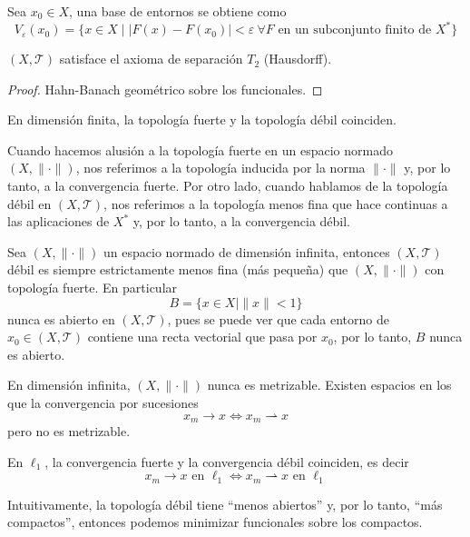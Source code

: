 \begin{observacion}
    Sea $x_0 \in X$, una base de entornos se obtiene como
    \[ V_\varepsilon(x_0) = \{ x \in X \mid |F(x) - F(x_0)| < \varepsilon \ \forall F \text{ en un subconjunto finito de } X^* \} \]
\end{observacion}


\begin{prop}
    $(X, \mathcal{T})$ satisface el axioma de separación $T_2$ (Hausdorff).
\begin{proof}
    Hahn-Banach geométrico sobre los funcionales.
\end{proof}
\end{prop}

\begin{observacion}
    En dimensión finita, la topología fuerte y la topología débil coinciden.
\end{observacion}


\begin{observacion}
    Cuando hacemos alusión a la topología fuerte en un espacio normado $(X,\|\cdot\|)$, nos referimos a la topología inducida por la norma $\|\cdot\|$ y, por lo tanto, a la convergencia fuerte. Por otro lado, cuando hablamos de la topología débil en $(X, \mathcal{T})$, nos referimos a la topología menos fina que hace continuas a las aplicaciones de $X^*$ y, por lo tanto, a la convergencia débil.
\end{observacion}

\begin{observacion}
    Sea $(X, \|\cdot\|)$ un espacio normado de dimensión infinita, entonces $(X, \mathcal{T})$ débil es siempre estrictamente menos fina (más pequeña) que $(X, \|\cdot\|)$ con topología fuerte. En particular
    \begin{equation*}
        B = \{ x \in X \mid \|x\| < 1 \}
    \end{equation*}
    nunca es abierto en $(X, \mathcal{T})$, pues se puede ver que cada entorno de $x_0 \in (X, \mathcal{T})$ contiene una recta vectorial que pasa por $x_0$, por lo tanto, $B$ nunca es abierto. 
\end{observacion}


\begin{observacion}
    En dimensión infinita, $(X, \|\cdot\|)$ nunca es metrizable. Existen espacios en los que la convergencia por sucesiones 
    $$x_m \to x \iff x_m \rightharpoonup x$$
    pero no es metrizable. 
\end{observacion}


\begin{ejercicio}
    En $\ell_1$, la convergencia fuerte y la convergencia débil coinciden, es decir
    \begin{equation*}
            x_m \to x \text{ en } \ell_1 \iff x_m \rightharpoonup x \text{ en } \ell_1
    \end{equation*}
\end{ejercicio}

\noindent
Intuitivamente, la topología débil tiene ``menos abiertos'' y, por lo tanto, ``más compactos'', entonces podemos minimizar funcionales sobre los compactos.